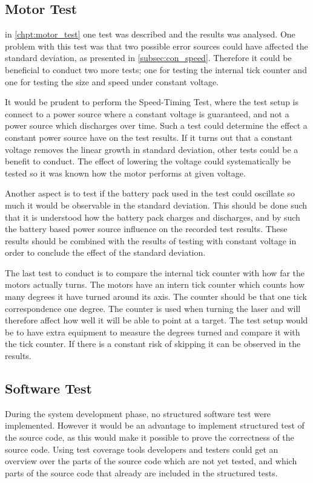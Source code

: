 \subsection{Motor Test}\label{subsec:disc_motor}
in \cref{chpt:motor_test} one test was described and the results was analysed. One problem with this test was that two possible error sources could have affected the standard deviation, as presented in \cref{subsec:con_speed}. Therefore it could be beneficial to conduct two more tests; one for testing the internal tick counter and one for testing the size and speed under constant voltage.

It would be prudent to perform the Speed-Timing Test, where the test setup is connect to a power source where a constant voltage is guaranteed, and not a power source which discharges over time. Such a test could determine the effect a constant power source have on the test results. If it turns out that a constant voltage removes the linear growth in standard deviation, other tests could be a benefit to conduct. The effect of lowering the voltage could systematically be tested so it was known how the motor performs at given voltage.

Another aspect is to test if the battery pack used in the test could oscillate so much it would be observable in the standard deviation. This should be done such that it is understood how the battery pack charges and discharges, and by such the battery based power source influence on the recorded test results. These results should be combined with the results of testing with constant voltage in order to conclude the effect of the standard deviation.

The last test to conduct is to compare the internal tick counter with how far the motors actually turns. The motors have an intern tick counter which counts how many degrees it have turned around its axis. The counter should be that one tick correspondence one degree. The counter is used when turning the laser and will therefore affect how well it will be able to point at a target. The test setup would be to have extra equipment to measure the degrees turned and compare it with the tick counter. If there is a constant risk of skipping it can be observed in the results.


\subsection{Software Test}\label{subsec:disc_software}
During the system development phase, no structured software test were implemented. However it would be an advantage to implement structured test of the source code, as this would make it possible to prove the correctness of the source code. Using test coverage tools developers and testers could get an overview over the parts of the source code which are not yet tested, and which parts of the source code that already are included in the structured tests.

